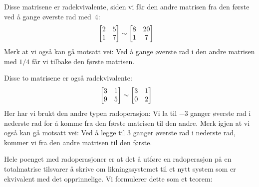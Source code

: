 \begin{ex}
\label{ex:radekvivalent}
Disse matrisene er radekvivalente, siden vi får den andre matrisen fra
den første ved å gange øverste rad med~$4$:
\begin{align*}
\begin{bmatrix}
 2 & 5 \\
 1 & 7
\end{bmatrix}
&\sim
\begin{bmatrix}
 8 & 20 \\
 1 &  7
\end{bmatrix}
\end{align*}
Merk at vi også kan gå motsatt vei: Ved å gange øverste rad i den
andre matrisen med $1/4$ får vi tilbake den første matrisen.

Disse to matrisene er også radekvivalente:
\begin{align*}
\begin{bmatrix}
 3 & 1 \\
 9 & 5
\end{bmatrix}
&\sim
\begin{bmatrix}
 3 & 1 \\
 0 & 2
\end{bmatrix}
\end{align*}
Her har vi brukt den andre typen radoperasjon: Vi la til $-3$ ganger
øverste rad i nederste rad for å komme fra den første matrisen til den
andre.  Merk igjen at vi også kan gå motsatt vei: Ved å legge til $3$
ganger øverste rad i nederste rad, kommer vi fra den andre matrisen
til den første.
\end{ex}

Hele poenget med radoperasjoner er at det å utføre en radoperasjon på
en totalmatrise tilsvarer å skrive om likningssystemet til et nytt
system som er ekvivalent med det opprinnelige.  Vi formulerer dette
som et teorem:

